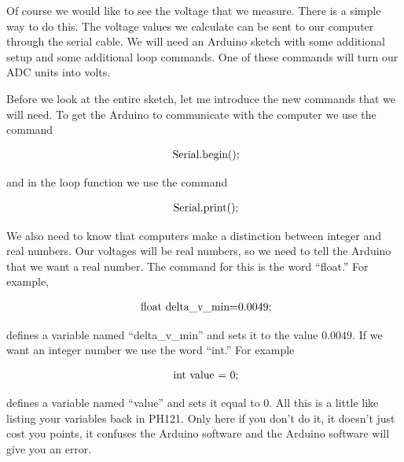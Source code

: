 Of course we would like to see the voltage that we measure. There is a simple way to do this. The voltage values we calculate can be sent to our computer through the serial cable. We will need an Arduino sketch with some additional setup and some additional loop commands. One of these commands will turn our ADC units into volts. 

Before we look at the entire sketch, let me introduce the new commands that we will need. To get the Arduino to communicate with the computer we use the command 

\begin{equation*}
	\begin{tabular}{l}
		\ Serial.begin();
	\end{tabular}
\end{equation*}

\noindent and in the loop function we use the command

\begin{equation*}
	\begin{tabular}{l}
		\ Serial.print();
	\end{tabular}
\end{equation*}

We also need to know that computers make a distinction between integer and real numbers. Our voltages will be real numbers, so we need to tell the Arduino that we want a real number. The command for this is the word ``float.'' For example,

\begin{equation*}
	\begin{tabular}{l}
		\ float\ delta\_v\_min=0.0049;
	\end{tabular}
\end{equation*}

\noindent defines a variable named ``delta\_v\_min'' and sets it to the value $0.0049.$ If we want an integer number we use the word ``int.''  For example 

\begin{equation*}
	\begin{tabular}{l}
		\ int\ value\ =\ 0;
	\end{tabular}
\end{equation*}

\noindent defines a variable named ``value'' and sets it equal to $0.$ All this is a little like listing your variables back in PH121. Only here if you don't do it, it doesn't just cost you points, it confuses the Arduino software and the Arduino software will give you an error.

